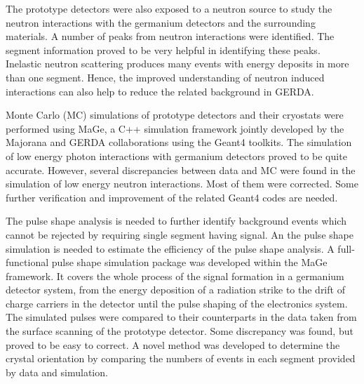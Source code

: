 The prototype detectors were also exposed to a neutron source to study the neutron interactions with the germanium detectors and the surrounding materials. A number of peaks from neutron interactions were identified. The segment information proved to be very helpful in identifying these peaks. Inelastic neutron scattering produces many events with energy deposits in more than one segment. Hence, the improved understanding of neutron induced interactions can also help to reduce the related background in GERDA.

Monte Carlo (MC) simulations of prototype detectors and their cryostats were performed using MaGe, a C++ simulation framework jointly developed by the Majorana and GERDA collaborations using the Geant4 toolkits. The simulation of low energy photon interactions with germanium detectors proved to be quite accurate. However, several discrepancies between data and MC were found in the simulation of low energy neutron interactions. Most of them were corrected. Some further verification and improvement of the related Geant4 codes are needed.

The pulse shape analysis is needed to further identify background events which cannot be rejected by requiring single segment having signal. An the pulse shape simulation is needed to estimate the efficiency of the pulse shape analysis. A full-functional pulse shape simulation package was developed within the MaGe framework. It covers the whole process of the signal formation in a germanium detector system, from the energy deposition of a radiation strike to the drift of charge carriers in the detector until the pulse shaping of the electronics system. The simulated pulses were compared to their counterparts in the data taken from the surface scanning of the prototype detector. Some discrepancy was found, but proved to be easy to correct. A novel method was developed to determine the crystal orientation by comparing the numbers of events in each segment provided by data and simulation.

